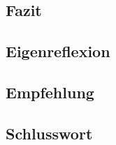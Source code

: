 \documentclass[../../main.tex]{subfiles}
\begin{document}
\subsection{Fazit}


\subsection{Eigenreflexion}


\subsection{Empfehlung}


\subsection{Schlusswort}

\end{document}
